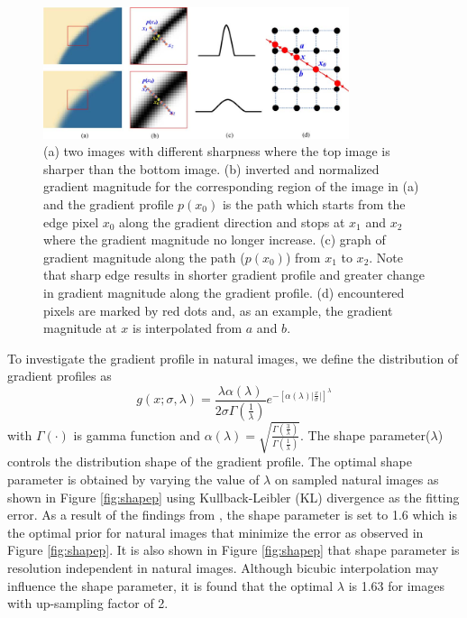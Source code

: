 \documentclass[a4paper,11pt]{article}
\begin{document}
\begin{figure}[H]
	\centering
	\includegraphics[width=0.8\textwidth]{Gradient-profile-a-Two-edges-with-different-sharpness-b-Gradient-maps-normalized.png}
	\caption{(a) two images with different sharpness where the top image is sharper than the bottom image. (b) inverted and normalized gradient magnitude for the corresponding region of the image in (a) and the gradient profile $p(x_0)$ is the path which starts from the edge pixel $x_0$ along the gradient direction and stops at $x_1$ and $x_2$ where the gradient magnitude no longer increase. (c) graph of gradient magnitude along the path ($p(x_0)$) from  $x_1$ to $x_2$. Note that sharp edge results in shorter gradient profile and greater change in gradient magnitude along the gradient profile. (d) encountered pixels are marked by red dots and, as an example, the gradient magnitude at $x$ is interpolated from $a$ and $b$.}
	\label{fig:gp}
\end{figure}

To investigate the gradient profile in natural images, we define the distribution of gradient profiles as
\begin{equation}
	g(x; \sigma, \lambda) = \frac{\lambda \alpha (\lambda)}{2 \sigma \Gamma(\frac{1}{\lambda})} e^{-[\alpha (\lambda)\lvert \frac{x}{\sigma} \rvert]^\lambda}
\end{equation}
with $\Gamma(\cdot)$ is gamma function and $\alpha (\lambda) = \sqrt{\frac{\Gamma(\frac{3}{\lambda})}{\Gamma(\frac{1}{\lambda})}}$. The shape parameter($\lambda$) controls the distribution shape of the gradient profile. The optimal shape parameter is obtained by varying the value of $\lambda$ on sampled natural images as shown in Figure \ref{fig:shapep} using Kullback-Leibler (KL) divergence as the fitting error. As a result of the findings from \cite{sr11}, the shape parameter is set to 1.6 which is the optimal prior for natural images that minimize the error as observed in Figure \ref{fig:shapep}. It is also shown in Figure \ref{fig:shapep} that shape parameter is resolution independent in natural images. Although bicubic interpolation may influence the shape parameter, it is found that the optimal $\lambda$ is 1.63 for images with up-sampling factor of 2. 
\end{document}
